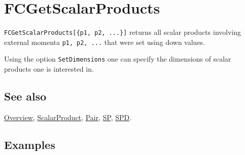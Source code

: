 \documentclass[../FeynCalcManual.tex]{subfiles}
\begin{document}
\hypertarget{fcgetscalarproducts}{
\section{FCGetScalarProducts}\label{fcgetscalarproducts}}

\texttt{FCGetScalarProducts[\allowbreak{}\{\allowbreak{}p1,\ \allowbreak{}p2,\ \allowbreak{}...\}]}
returns all scalar products involving external momenta
\texttt{p1,\ \allowbreak{}p2,\ \allowbreak{}...} that were set using
down values.

Using the option \texttt{SetDimensions} one can specify the dimensions
of scalar products one is interested in.

\subsection{See also}

\hyperlink{toc}{Overview}, \hyperlink{scalarproduct}{ScalarProduct},
\hyperlink{pair}{Pair}, \hyperlink{sp}{SP}, \hyperlink{spd}{SPD}.

\subsection{Examples}

\begin{Shaded}
\begin{Highlighting}[]
\OperatorTok{[]}\NormalTok{;}
\OperatorTok{[}\OperatorTok{]} \ExtensionTok{=}\SpecialCharTok{\^{}}\NormalTok{;}
\OperatorTok{[}\OperatorTok{]} \ExtensionTok{=}\SpecialCharTok{\^{}}\NormalTok{;}
\OperatorTok{[}\OperatorTok{,}\OperatorTok{]} \ExtensionTok{=} \NormalTok{;}
\OperatorTok{[}\OperatorTok{]} \ExtensionTok{=}\SpecialCharTok{\^{}}\NormalTok{;}
\OperatorTok{[}\OperatorTok{]} \ExtensionTok{=}\SpecialCharTok{\^{}}\NormalTok{;}
\OperatorTok{[}\OperatorTok{,}\OperatorTok{]} \ExtensionTok{=} \NormalTok{;}
\end{Highlighting}
\end{Shaded}

\begin{Shaded}
\begin{Highlighting}[]
\OperatorTok{[\{}\OperatorTok{,}\OperatorTok{,}\OperatorTok{,}\OperatorTok{\}]}
\end{Highlighting}
\end{Shaded}
\end{document}

